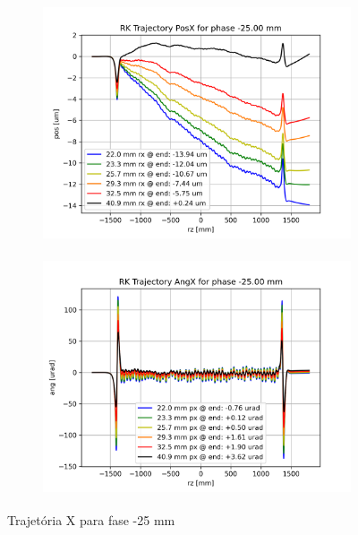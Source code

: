 \documentclass[a4paper,12pt]{article}
\begin{document}
\begin{figure}[H]
\begin{subfigure}{0.5\textwidth}
\includegraphics[width=0.9\linewidth, height=7cm]{figs/phase-25 RK Posx.png} 
\label{fig:subim1-25tx}
\end{subfigure}
\begin{subfigure}{0.5\textwidth}
\includegraphics[width=0.9\linewidth, height=7cm]{figs/phase-25 RK Angx.png}
\label{fig:subim2-25tx}
\end{subfigure}
\caption{Trajetória X para fase -25 mm}
\label{fig:trajx-25}
\end{figure}
\end{document}

